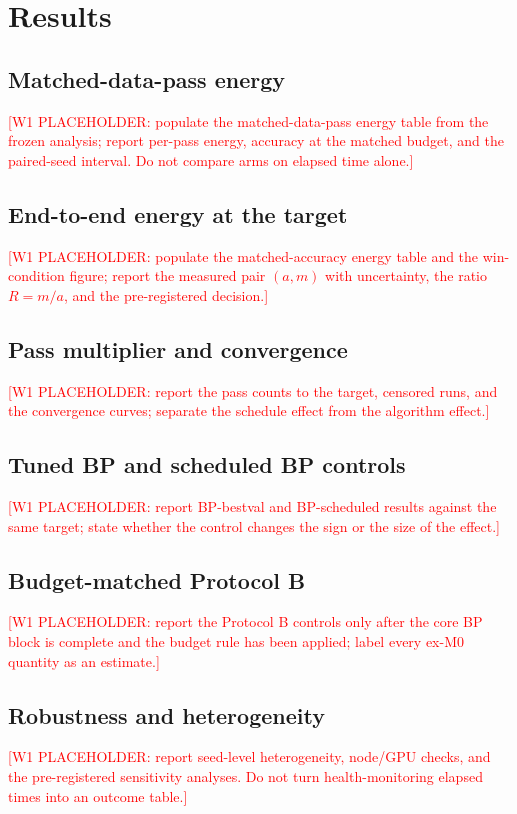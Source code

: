 \documentclass[preprint,12pt]{elsarticle}
\newcommand{\wone}[1]{\textcolor{red}{[W1 PLACEHOLDER: #1]}}
\begin{document}
\section{Results}
\label{sec:results}


\subsection{Matched-data-pass energy}
\wone{populate the matched-data-pass energy table from the frozen analysis;
report per-pass energy, accuracy at the matched budget, and the paired-seed
interval.  Do not compare arms on elapsed time alone.}

\subsection{End-to-end energy at the target}
\wone{populate the matched-accuracy energy table and the win-condition figure;
report the measured pair $(a,m)$ with uncertainty, the ratio $R=m/a$, and the
pre-registered decision.}

\subsection{Pass multiplier and convergence}
\wone{report the pass counts to the target, censored runs, and the
convergence curves; separate the schedule effect from the algorithm effect.}

\subsection{Tuned BP and scheduled BP controls}
\wone{report BP-bestval and BP-scheduled results against the same target;
state whether the control changes the sign or the size of the effect.}

\subsection{Budget-matched Protocol B}
\wone{report the Protocol B controls only after the core BP block is complete
and the budget rule has been applied; label every ex-M0 quantity as an
estimate.}

\subsection{Robustness and heterogeneity}
\wone{report seed-level heterogeneity, node/GPU checks, and the pre-registered
sensitivity analyses.  Do not turn health-monitoring elapsed times into an
outcome table.}
\end{document}
